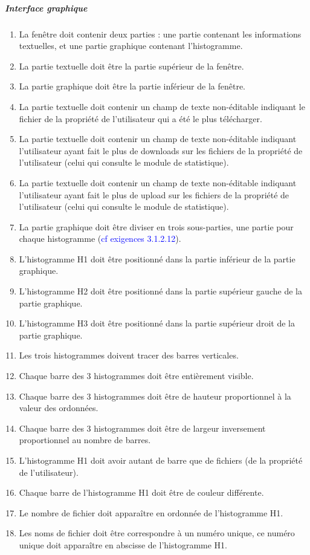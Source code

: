 \documentclass[10pt,a4paper]{report}
\begin{document}
	
	\subparagraph{Interface graphique}
		\begin{enumerate}
			\item La fenêtre doit contenir deux parties : une partie contenant les informations textuelles, et une partie graphique contenant l'histogramme.
			\item La partie textuelle doit être la partie supérieur de la fenêtre.
			\item La partie graphique doit être la partie inférieur de la fenêtre.
			\item La partie textuelle doit contenir un champ de texte non-éditable indiquant le fichier de la propriété de l'utilisateur qui a été le plus télécharger.
			\item La partie textuelle doit contenir un champ de texte non-éditable indiquant l'utilisateur ayant fait le plus de downloads sur les fichiers de la propriété de l'utilisateur (celui qui consulte le module de statistique).
			\item La partie textuelle doit contenir un champ de texte non-éditable indiquant l'utilisateur ayant fait le plus de upload sur les fichiers de la propriété de l'utilisateur (celui qui consulte le module de statistique).
			\item La partie graphique doit être diviser en trois sous-parties, une partie pour chaque histogramme (\textcolor{blue}{cf exigences 3.1.2.12}).
			\item L'histogramme H1 doit être positionné dans la partie inférieur de la partie graphique.
			\item L'histogramme H2 doit être positionné dans la partie supérieur gauche de la partie graphique.
			\item L'histogramme H3 doit être positionné dans la partie supérieur droit de la partie graphique.
			\item Les trois histogrammes doivent tracer des barres verticales.
			\item Chaque barre des 3 histogrammes doit être entièrement visible.
			\item Chaque barre des 3 histogrammes doit être de hauteur proportionnel à la valeur des ordonnées.
			\item Chaque barre des 3 histogrammes doit être de largeur inversement proportionnel au nombre de barres.

			\item L'histogramme H1 doit avoir autant de barre que de fichiers (de la propriété de l'utilisateur).
			\item Chaque barre de l'histogramme H1 doit être de couleur différente.
			\item Le nombre de fichier doit apparaître en ordonnée de l'histogramme H1.
			\item Les noms de fichier doit être correspondre à un numéro unique, ce numéro unique doit apparaître en abscisse de l'histogramme H1.


\end{enumerate}
\end{document}
